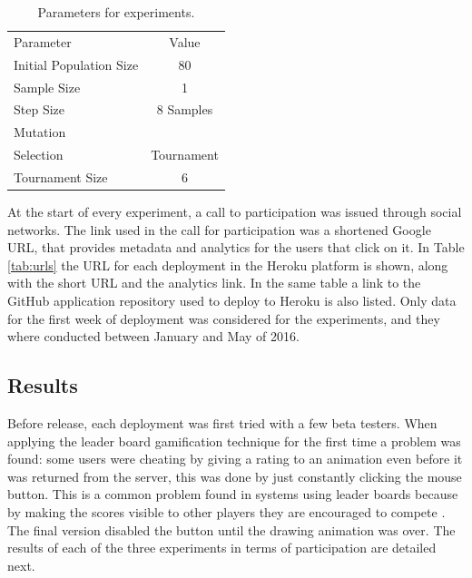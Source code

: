 \begin{table}
  \small
  \caption{ Parameters for experiments.  }
  \label{tab:params} 
  \centering
  \small
  \begin{tabular}{l  c}
    \hline\noalign{\smallskip}
     Parameter & Value \\
    \noalign{\smallskip}\hline\noalign{\smallskip}
    Initial Population Size   & 80 \\ \hline
    Sample Size & 1 \\ \hline
    Step Size & 8 Samples \\ \hline
    Mutation &  \\ \hline
    Selection & Tournament \\ \hline
    Tournament Size &  6 \\ \hline
  \end{tabular}
\end{table}

At the start of every experiment, a call to participation was issued
through social networks.  The link used in the call for participation
was a shortened Google URL, that provides metadata and analytics for the
users that click on it. %
  In Table \ref{tab:urls} the URL for each 
deployment in the Heroku platform is shown,
along with the short URL and the analytics link. In the same table a link to the GitHub 
application repository used to deploy to Heroku is also listed. Only data 
for the first week of deployment was considered for the experiments, and they where conducted 
between January and May of 2016. 

\subsection{Results} 
Before release, each deployment was first tried with a few beta testers. 
When applying the leader board gamification technique for the first time a 
problem was found: some users were cheating by giving a
rating to an animation even before it was returned from the server, this was done by just
constantly clicking the mouse button. This is a common problem found in systems using leader
boards because by making the scores visible to other players they are encouraged 
to compete \cite{hickman2010total}. The final version disabled the button until 
the drawing animation was over. The results of each of the three experiments in 
terms of participation are detailed next.

